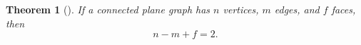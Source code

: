 \documentclass[12pt]{article}
\begin{document}
\newtheorem{thm}{Theorem}
\begin{thm}[]
If a connected plane graph  has $n$ vertices, $m$ edges, and $f$ faces, then
$$n - m + f = 2.$$
\end{thm}
\end{document}
